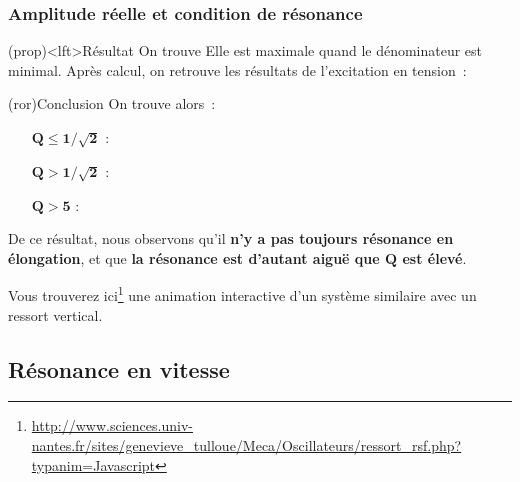 \documentclass[../../main/main.tex]{subfiles}
\begin{document}
\subsubsection{Amplitude réelle et condition de résonance}
\begin{tcb}(prop)<lft>{Résultat}
	On trouve
	Elle est maximale quand le dénominateur est minimal. Après calcul, on retrouve
	les résultats de l'excitation en tension~:
\end{tcb}
\begin{tcb}(ror){Conclusion}
	On trouve alors~:
	\begin{itemize}[leftmargin=60pt]
		\item[$\mathbf{Q \leq 1/\sqrt{2}}$] :
			\vspace{-15pt}
		\item[$\mathbf{Q > 1/\sqrt{2}}$] :
			\vspace{-15pt}
		\item[$\mathbf{Q > 5}$] :
	\end{itemize}
	De ce résultat, nous observons qu'il \textbf{n'y a pas toujours résonance en
		élongation}, et que \textbf{la résonance est d'autant aiguë que $\mathbf{Q}$
		est élevé}.
\end{tcb}

Vous trouverez ici\footnote{\href{http://www.sciences.univ-nantes.fr/sites/genevieve\_tulloue/Meca/Oscillateurs/ressort\_rsf.php?typanim=Javascript}{http://www.sciences.univ-nantes.fr/sites/genevieve\_tulloue/Meca/Oscillateurs/ressort\_rsf.php?typanim=Javascript}} une animation interactive d'un système similaire avec un
ressort vertical.

\subsection{Résonance en vitesse}
\end{document}
